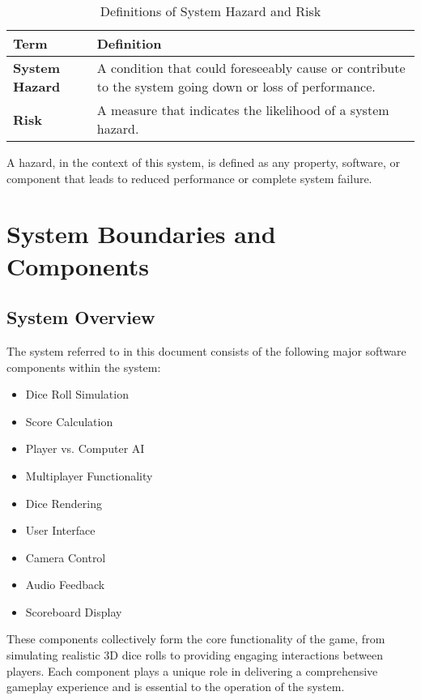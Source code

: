 \documentclass{article}
\begin{document}
\begin{table}[H]
    \centering
    \begin{tabular}{|l|p{10cm}|}
    \hline
    \textbf{Term} & \textbf{Definition} \\ \hline
    \textbf{System Hazard} & A condition that could foreseeably cause or contribute to the system going down or loss of performance. \\ \hline
    \textbf{Risk} & A measure that indicates the likelihood of a system hazard. \\ \hline
    \end{tabular}
    \caption{Definitions of System Hazard and Risk}
\end{table}

A hazard, in the context of this system, is defined as any property, software, or component that leads to reduced performance or complete system failure.

\section{System Boundaries and Components}

\subsection{System Overview}

The system referred to in this document consists of the following major software components within the system:

\begin{itemize}
    \item Dice Roll Simulation
    \item Score Calculation
    \item Player vs. Computer AI
    \item Multiplayer Functionality
    \item Dice Rendering
    \item User Interface
    \item Camera Control
    \item Audio Feedback
    \item Scoreboard Display
\end{itemize}

These components collectively form the core functionality of the game, from simulating realistic 3D dice rolls to providing engaging interactions between players. Each component plays a unique role in delivering a comprehensive gameplay experience and is essential to the operation of the system.
\end{document}
